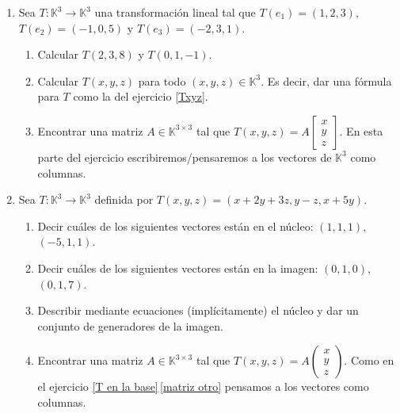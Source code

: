 \begin{enumerate}[topsep=6pt, itemsep=.4cm]
    \item\label{T en la base} Sea $T:\mathbb{K}^3\longrightarrow\mathbb{K}^3$ una transformación lineal tal que $T(e_1)=(1,2,3)$, $T(e_2)=(-1,0,5)$ y $T(e_3)=(-2,3,1)$. 
        \begin{enumerate}
        \item\label{T en dos vectores} Calcular $T(2,3,8)$ y $T(0,1,-1)$. 
        \item\label{T en la base b} Calcular $T(x,y,z)$ para todo $(x,y,z)\in\mathbb{K}^3$. Es decir, dar una fórmula para $T$ como la del ejercicio \ref{Txyz}.
        \item\label{matriz otro}  Encontrar una matriz $A\in\mathbb{K}^{3\times3}$ tal que
        $T(x,y,z)=A\begin{bmatrix}
        x\\y\\z \end{bmatrix}$. En esta parte del ejercicio escribiremos/pensaremos a los vectores de $\mathbb{K}^3$ como columnas.
        \end{enumerate}
    
        \rta
    
    
        
    \item\label{Txyz} Sea $T:\mathbb{K}^3\longrightarrow\mathbb{K}^3$ definida por $T(x,y,z)=(x+2y+3z, y-z,x+5y)$.
    \begin{enumerate}
    \item\label{Txyz-vectores-nucleo} Decir cuáles de los siguientes vectores están en el núcleo: $(1,1,1)$, $(-5,1,1)$.
    \item\label{Txyz imagen} Decir cuáles de los siguientes vectores están en la imagen: $(0,1,0)$, $(0,1,7)$.
    \item\label{Txyz nucleo imagen} Describir mediante ecuaciones (implícitamente) el núcleo y dar un conjunto de generadores de la imagen.
    \item\label{matriz} Encontrar una matriz  $A\in\mathbb{K}^{3\times 3}$ tal que $T(x,y,z)=A\left(\begin{matrix}
        x\\y\\z \end{matrix}
        \right)$.  Como en el ejercicio  \ref{T en la base}\,\ref{matriz otro} pensamos a los vectores como columnas.
    \end{enumerate}
    
    \rta
    

\end{enumerate}
